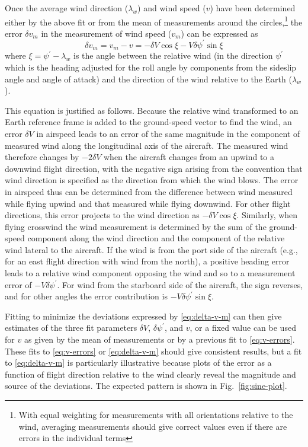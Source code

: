 \documentclass[12pt,twoside,english]{article}\usepackage[]{graphicx}\usepackage[]{color}
\begin{document}
{{Once the average wind direction ($\lambda_w$) and wind speed ($v$) have been determined either by the above fit or from the mean of measurements around the circles,\footnote{With equal weighting for measurements with all orientations relative to the wind, averaging measurements should give correct values even if there are errors in the individual terms} the error $\delta v_{m}$ in the measurement of wind speed ($v_{m}$) can be expressed as\\ 
\begin{equation}
\delta v_{m}=v_{m}-v=-\delta V\cos\xi-V\delta\psi^{\prime}\sin\xi\label{eq:delta-v-m} 
\end{equation}
%
where $\xi=\psi^{\prime}-\lambda_w$ is the angle between the relative wind (in the direction $\psi^{\prime}$ which is the heading adjusted for the roll angle by components from the sideslip angle and angle of attack) and the direction of the wind relative to the Earth ($\lambda_w$). 

This equation is justified as follows. Because the relative wind transformed to an Earth reference frame is added to the ground-speed vector to find the wind, an error $\delta V$ in airspeed leads to an error of the same magnitude in the component of measured wind along the longitudinal axis of the aircraft. The measured wind therefore changes by $-2\delta V$ when the aircraft changes from an upwind to a downwind flight direction, with the negative sign arising from the convention that wind direction is specified as the direction from which the wind blows. The error in airspeed thus can be determined from the difference between wind measured while flying upwind and that measured while flying downwind. For other flight directions, this error projects to the wind direction as $-\delta V\cos\xi$. Similarly, when flying crosswind the wind measurement is determined by the sum of the ground-speed component along the wind direction and the component of the relative wind lateral to the aircraft. If the wind is from the port side of the aircraft (e.g., for an east flight direction with wind from the north), a positive heading error leads to a relative wind component opposing the wind and so to a measurement error of $-V\delta\psi^{\prime}$. For wind from the starboard side of the aircraft, the sign reverses, and for other angles the error contribution is $-V\delta\psi^{\prime}\sin\xi$. 

Fitting to minimize the deviations expressed by \eqref{eq:delta-v-m} can then  give estimates of the three fit parameters $\delta V$, $\delta\psi^{\prime}$, and $v$, or a fixed value can be used for $v$ as given by the mean of measurements or by a previous fit to \eqref{eq:v-errors}. These fits to \eqref{eq:v-errors} or \eqref{eq:delta-v-m} should give consistent results, but a fit to \eqref{eq:delta-v-m} is particularly illustrative because plots of the error as a function of flight direction relative to the wind clearly reveal the magnitude and source of the deviations. The expected pattern is shown in Fig.~\ref{fig:sine-plot}. 

}}
\end{document}

